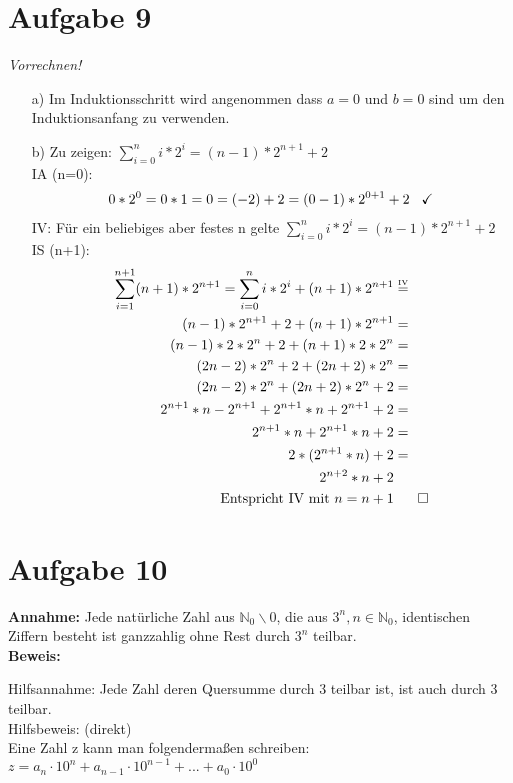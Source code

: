 \documentclass[paper = a4, ngerman]{scrartcl}
\begin{document}
\section*{Aufgabe 9}
	\textit{Vorrechnen!}
		\begin{itemize}
			\item[a)] Im Induktionsschritt wird angenommen dass $a=0$ und $b=0$ sind um den Induktionsanfang zu verwenden.
			\item[b)] Zu zeigen: $\displaystyle\sum_{i=0}^{n} i*2^i = (n-1)*2^{n+1}+2$\\
			IA (n=0):
			\begin{align*}
			0*2^0 = 0*1 = 0 = (-2) + 2 = (0-1)*2^{0+1}+2 \hspace{3mm}\checkmark
			\end{align*}
			IV: Für ein beliebiges aber festes n gelte $\displaystyle\sum_{i=0}^{n} i*2^i = (n-1)*2^{n+1}+2$\\
			IS (n+1):
			\begin{align*}
			\displaystyle\sum_{i=1}^{n+1} (n+1)*2^{n+1} = \sum_{i=0}^{n} i*2^i + (n+1)*2^{n+1} &\overset{\text{\tiny{IV}}}{=}\\
			(n-1)*2^{n+1}+2+(n+1)*2^{n+1} &=\\
			(n-1)*2*2^{n}+2+(n+1)*2*2^n &=\\
			(2n-2)*2^{n}+2+(2n+2)*2^n &=\\
			(2n-2)*2^{n}+(2n+2)*2^n + 2 &=\\
			2^{n+1}*n-2^{n+1}+2^{n+1}*n+2^{n+1}+2 &=\\
			2^{n+1}*n+2^{n+1}*n+2 &=\\
			2*(2^{n+1}*n)+2 &=\\
			2^{n+2}*n+2 &\\
			\text{Entspricht IV mit } n=n+1& \hspace{6mm} \Box
			\end{align*}
		\end{itemize}
	
\pagebreak
\section*{Aufgabe 10}

\textbf{Annahme:} Jede natürliche Zahl aus $\mathbb{N}_0\backslash{0}$, die aus $3^n, n \in \mathbb{N}_0 $, identischen Ziffern besteht ist ganzzahlig ohne Rest durch $3^n$ teilbar.\\

\textbf{Beweis:}

Hilfsannahme: Jede Zahl deren Quersumme durch 3 teilbar ist, ist auch durch 3 teilbar.\\
Hilfsbeweis:  (direkt)\\
Eine Zahl z kann man folgendermaßen schreiben:\\ 
$z = a_n \cdot 10^n + a_{n-1} \cdot 10^{n-1} + ... + a_0 \cdot 10^0$\\
\end{document}
